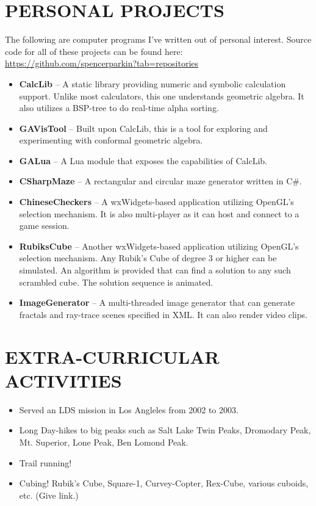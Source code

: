 \documentclass[margin]{res}
\begin{document}
\begin{resume}
\begin{itemize}
		\end{itemize}

\section{PERSONAL PROJECTS}
		The following are computer programs I've written out of personal interest.  Source code for all of these projects can be found here: \url{https://github.com/spencerparkin?tab=repositories}
		\begin{itemize}\itemsep -2pt %
		\item \textbf{CalcLib} -- A static library providing numeric and symbolic calculation support.  Unlike most calculators, this one understands geometric algebra.  It also utilizes a BSP-tree to do real-time alpha sorting.
		\item \textbf{GAVisTool} -- Built upon CalcLib, this is a tool for exploring and experimenting with conformal geometric algebra.
		\item \textbf{GALua} -- A Lua module that exposes the capabilities of CalcLib.
		\item \textbf{CSharpMaze} -- A rectangular and circular maze generator written in C\#.
		\item \textbf{ChineseCheckers} -- A wxWidgets-based application utilizing OpenGL's selection mechanism.  It is also multi-player as it can host and connect to a game session.
		\item \textbf{RubiksCube} -- Another wxWidgets-based application utilizing OpenGL's selection mechanism.  Any Rubik's Cube of degree 3 or higher can be simulated.  An algorithm is provided that can find a solution to any such scrambled cube.  The solution sequence is animated.
		\item \textbf{ImageGenerator} -- A multi-threaded image generator that can generate fractals and ray-trace scenes specified in XML.  It can also render video clips.
		\end{itemize}

\section{EXTRA-CURRICULAR \\ ACTIVITIES}
		\begin{itemize}\itemsep -2pt %
		\item Served an LDS mission in Los Angleles from 2002 to 2003.
		\item Long Day-hikes to big peaks such as Salt Lake Twin Peaks, Dromodary Peak, Mt. Superior, Lone Peak, Ben Lomond Peak.
		\item Trail running!
		\item Cubing!  Rubik's Cube, Square-1, Curvey-Copter, Rex-Cube, various cuboids, etc.  (Give link.)
		\end{itemize}

\end{resume}
\end{document}
